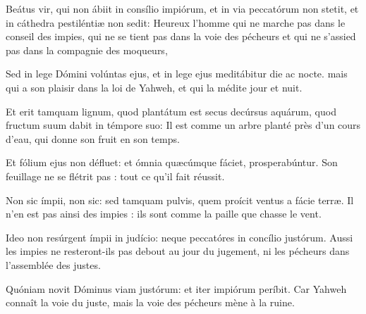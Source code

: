 
\begin{paracol}{2}

\LigneParacol{0cm}
{Beátus vir, qui non ábiit in consílio impiórum, et in via peccatórum non stetit, \GreStar{} et in cáthedra pestiléntiæ non sedit:}
{Heureux l'homme qui ne marche pas dans le conseil des impies, qui ne se tient pas dans la voie des pécheurs et qui ne s'assied pas dans la compagnie des moqueurs, }

\LigneParacol{0.2cm}
{Sed in lege Dómini volúntas ejus, \GreStar{} et in lege ejus meditábitur die ac nocte.}
{mais qui a son plaisir dans la loi de Yahweh, et qui la médite jour et nuit. }

\LigneParacol{0.2cm}
{Et erit tamquam lignum, quod plantátum est secus decúrsus aquárum, \GreStar{} quod fructum suum dabit in témpore suo:}
{Il est comme un arbre planté près d'un cours d'eau, qui donne son fruit en son temps.}

\LigneParacol{0.2cm}
{Et fólium ejus non défluet: \GreStar{} et ómnia quæcúmque fáciet, prosperabúntur.}
{Son feuillage ne se flétrit pas : tout ce qu'il fait réussit. }

\LigneParacol{0.2cm}
{Non sic ímpii, non sic: \GreStar{} sed tamquam pulvis, quem proícit ventus a fácie terræ.}
{Il n'en est pas ainsi des impies : ils sont comme la paille que chasse le vent. }

\LigneParacol{0.2cm}
{Ideo non resúrgent ímpii in judício: \GreStar{} neque peccatóres in concílio justórum.}
{Aussi les impies ne resteront-ils pas debout au jour du jugement, ni les pécheurs dans l'assemblée des justes. }

\LigneParacol{0.2cm}
{Quóniam novit Dóminus viam justórum: \GreStar{} et iter impiórum períbit.}
{Car Yahweh connaît la voie du juste, mais la voie des pécheurs mène à la ruine. }

\end{paracol}
\Gloria
{}
